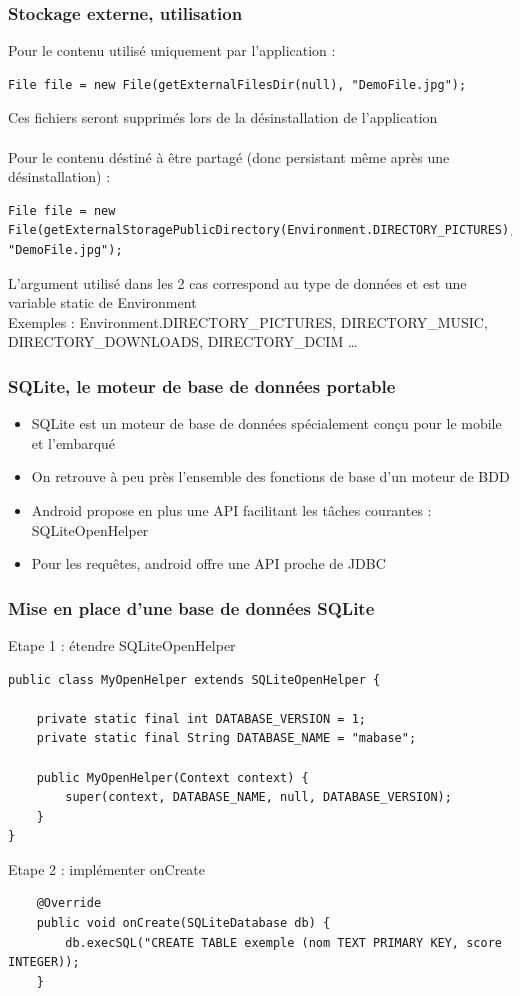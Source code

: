 \documentclass{beamer}
\begin{document}
\begin{frame}[fragile]
\frametitle{Stockage externe, utilisation}
Pour le contenu utilisé uniquement par l'application :
\begin{lstlisting}
File file = new File(getExternalFilesDir(null), "DemoFile.jpg");
\end{lstlisting}
Ces fichiers seront supprimés lors de la désinstallation de l'application\\\\
Pour le contenu déstiné à être partagé (donc persistant même après une désinstallation) : 
\begin{lstlisting}
File file = new File(getExternalStoragePublicDirectory(Environment.DIRECTORY_PICTURES), "DemoFile.jpg");
\end{lstlisting}
L'argument utilisé dans les 2 cas correspond au type de données et est une variable static de Environment\\
Exemples : Environment.DIRECTORY\_PICTURES, DIRECTORY\_MUSIC, DIRECTORY\_DOWNLOADS, DIRECTORY\_DCIM \ldots
\end{frame}
\begin{frame}[fragile]
\frametitle{SQLite, le moteur de base de données portable}
\begin{itemize}
    \item SQLite est un moteur de base de données spécialement conçu pour le
    mobile et l'embarqué
    \item On retrouve à peu près l'ensemble des fonctions de base d'un moteur de BDD
    \item Android propose en plus une API facilitant les tâches courantes : SQLiteOpenHelper
    \item Pour les requêtes, android offre une API proche de JDBC
\end{itemize}
\end{frame}
\begin{frame}[fragile]
\frametitle{Mise en place d'une base de données SQLite}
Etape 1 : étendre SQLiteOpenHelper 
\begin{lstlisting}
public class MyOpenHelper extends SQLiteOpenHelper {

    private static final int DATABASE_VERSION = 1;
    private static final String DATABASE_NAME = "mabase";

    public MyOpenHelper(Context context) {
        super(context, DATABASE_NAME, null, DATABASE_VERSION);
    }
}
\end{lstlisting}
Etape 2 : implémenter onCreate
\begin{lstlisting}
    @Override
    public void onCreate(SQLiteDatabase db) {
        db.execSQL("CREATE TABLE exemple (nom TEXT PRIMARY KEY, score INTEGER));
    }
\end{lstlisting}
\end{frame}
\end{document}
